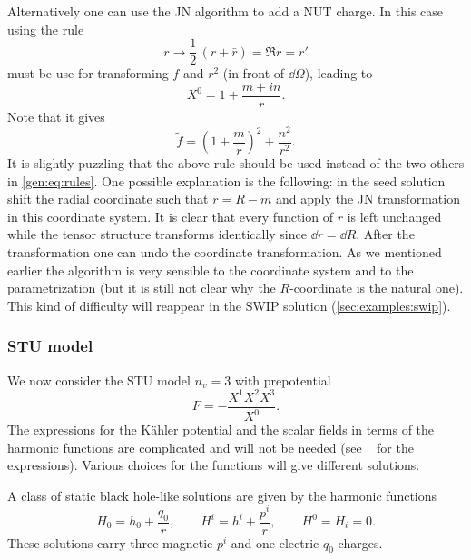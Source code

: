 Alternatively one can use the JN algorithm to add a NUT charge.
In this case using the rule 
\begin{equation}
	r \longrightarrow \frac{1}{2}\, (r + \bar r) = \Re r = r'
\end{equation} 
must be use for transforming $f$ and $r^2$ (in front of $\dd\Omega$), leading to
\begin{equation}
	\label{matter:eq:pure-sugra-static-X0-nut}
	X^0 = 1 + \frac{m + i n}{r}.
\end{equation} 
Note that it gives
\begin{equation}
	\tilde f = \left(1 + \frac{m}{r}\right)^2 + \frac{n^2}{r^2}.
\end{equation} 
It is slightly puzzling that the above rule should be used instead of the two others in \eqref{gen:eq:rules}.
One possible explanation is the following: in the seed solution shift the radial coordinate such that $r = R - m$ and apply the JN transformation in this coordinate system.
It is clear that every function of $r$ is left unchanged while the tensor structure transforms identically since $\dd r = \dd R$.
After the transformation one can undo the coordinate transformation.
As we mentioned earlier the algorithm is very sensible to the coordinate system and to the parametrization (but it is still not clear why the $R$-coordinate is the natural one).
This kind of difficulty will reappear in the SWIP solution (\cref{sec:examples:swip}).


\subsubsection{STU model}


We now consider the STU model $n_v = 3$ with prepotential~\cite[sec.~3]{Behrndt:1998:StationarySolutionsN2}
\begin{equation}
	F = - \frac{X^1 X^2 X^3}{X^0}.
\end{equation} 
The expressions for the Kähler potential and the scalar fields in terms of the harmonic functions are complicated and will not be needed (see ~\cite[sec.~3]{Behrndt:1998:StationarySolutionsN2} for the expressions).
Various choices for the functions will give different solutions.

A class of static black hole-like solutions are given by the harmonic functions~\cite[sec.~4.4]{Behrndt:1998:StationarySolutionsN2}
\begin{equation}
	\label{matter:eq:stu-static-functions}
	H_0 = h_0 + \frac{q_0}{r}, \qquad
	H^i = h^i + \frac{p^i}{r}, \qquad
	H^0 = H_i = 0.
\end{equation} 
These solutions carry three magnetic $p^i$ and one electric $q_0$ charges.

